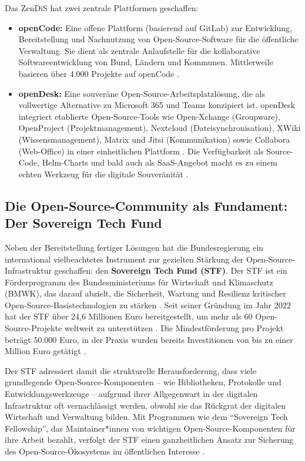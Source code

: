 \documentclass[12pt,a4paper]{article}
\begin{document}
	Das ZenDiS hat zwei zentrale Plattformen geschaffen:
	\begin{itemize}
		\item \textbf{openCode:} Eine offene Plattform (basierend auf GitLab) zur Entwicklung, Bereitstellung und Nachnutzung von Open-Source-Software für die öffentliche Verwaltung. Sie dient als zentrale Anlaufstelle für die kollaborative Softwareentwicklung von Bund, Ländern und Kommunen. Mittlerweile basieren über 4.000 Projekte auf openCode \cite{Heise2025a}.
		\item \textbf{openDesk:} Eine souveräne Open-Source-Arbeitsplatzlösung, die als vollwertige Alternative zu Microsoft 365 und Teams konzipiert ist. openDesk integriert etablierte Open-Source-Tools wie Open-Xchange (Groupware), OpenProject (Projektmanagement), Nextcloud (Dateisynchronisation), XWiki (Wissensmanagement), Matrix und Jitsi (Kommunikation) sowie Collabora (Web-Office) in einer einheitlichen Plattform \cite{AllThingsOpen2025}. Die Verfügbarkeit als Source-Code, Helm-Charts und bald auch als SaaS-Angebot macht es zu einem echten Werkzeug für die digitale Souveränität \cite{AllThingsOpen2025}.
	\end{itemize}
	
	\subsection{Die Open-Source-Community als Fundament: Der Sovereign Tech Fund}
	
	Neben der Bereitstellung fertiger Lösungen hat die Bundesregierung ein international vielbeachtetes Instrument zur gezielten Stärkung der Open-Source-Infrastruktur geschaffen: den \textbf{Sovereign Tech Fund (STF)}. Der STF ist ein Förderprogramm des Bundesministeriums für Wirtschaft und Klimaschutz (BMWK), das darauf abzielt, die Sicherheit, Wartung und Resilienz kritischer Open-Source-Basistechnologien zu stärken \cite{SovereignTechFund2025}. Seit seiner Gründung im Jahr 2022 hat der STF über 24,6 Millionen Euro bereitgestellt, um mehr als 60 Open-Source-Projekte weltweit zu unterstützen \cite{SovereignTechFund2025}. Die Mindestförderung pro Projekt beträgt 50.000 Euro, in der Praxis wurden bereits Investitionen von bis zu einer Million Euro getätigt \cite{SovereignTechFund2025}.
	
	Der STF adressiert damit die strukturelle Herausforderung, dass viele grundlegende Open-Source-Komponenten – wie Bibliotheken, Protokolle und Entwicklungswerkzeuge – aufgrund ihrer Allgegenwart in der digitalen Infrastruktur oft vernachlässigt werden, obwohl sie das Rückgrat der digitalen Wirtschaft und Verwaltung bilden. Mit Programmen wie dem \enquote{Sovereign Tech Fellowship}, das Maintainer*innen von wichtigen Open-Source-Komponenten für ihre Arbeit bezahlt, verfolgt der STF einen ganzheitlichen Ansatz zur Sicherung des Open-Source-Ökosystems im öffentlichen Interesse \cite{STFNews2025}.
	
\end{document}
